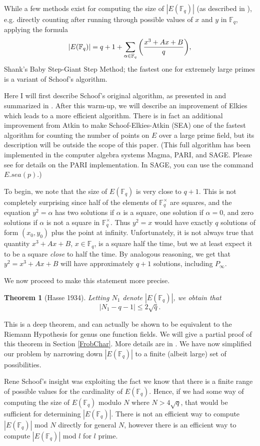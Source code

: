 \documentclass{article}
\newtheorem{Thm}{Theorem}
\newcommand{\f}{\mathbb{F}}
\begin{document}
While a few methods exist for computing the size of $|E(\f_q)|$ (as
described in \cite{Harris}), e.g. directly counting after running
through possible values of $x$ and $y$ in $\f_q$, applying the
formula $$|E(\f_q)| = q + 1 + \sum_{\alpha \in \f_q} \bigg({x^3+Ax+B
\over q}\bigg), $$ Shank's Baby Step-Giant Step
Method; the fastest one for extremely large primes is
a variant of Schoof's algorithm.

Here I will first describe Schoof's original algorithm, as presented
in \cite{Schoof1} and summarized in \cite{Wash}.  After this
warm-up, we will describe an improvement of Elkies which leads to a
more efficient algorithm.  There is in fact an additional
improvement from Atkin to make Schoof-Elkies-Atkin (SEA) one of the
fastest algorithm for counting the number of points on $E$ over a
large prime field, but its description will be outside the scope of
this paper.  (This full algorithm has been implemented in the
computer algebra systems Magma, PARI, and SAGE.  Please see
\cite{PariImp} for details on the PARI implementation.  In SAGE, you
can use the command $E.sea(p)$.)

To begin, we note that the size of $E(\f_q)$ is very close to $q+1$.  This is not completely surprising
since half of the elements of $\f_q^\times$ are squares, and the equation $y^2 = \alpha$ has two solutions
if $\alpha$ is a square, one solution if $\alpha=0$, and zero solutions if $\alpha$ is not a square
in $\f_q^\times$.  Thus $y^2 = x$ would have exactly $q$ solutions of form $(x_0,y_0)$ plus the point at
infinity. Unfortunately, it is not always true that quantity $x^3+Ax+B$, $x \in \f_q$, is a square half
the time, but we at least expect it to be a square \emph{close} to half the time.  By analogous
reasoning, we get that $y^2 = x^3+Ax+B$ will have approximately $q+1$ solutions, including
$P_\infty$.  

We now proceed to make this statement more precise.
\begin{Thm} [Hasse 1934] \label{HasseWeil}
Letting $N_1$ denote $|E(\f_q)|$, we obtain that $$|N_1 - q -1| \leq 2\sqrt{q}.$$
\end{Thm}
\noindent This is a deep theorem, and can actually be shown to be equivalent to the Riemann Hypothesis for
genus one function fields.  We will give a partial proof of this theorem in Section \ref{FrobChar}.  More details are in \cite{Wash}.
 We have now simplified our problem by narrowing down $|E(\f_q)|$ to a finite (albeit large) set of
possibilities.

Rene Schoof's insight was exploiting the fact we know that there is a finite range of
possible values for the cardinality of $E(\f_q)$.  Hence, if we had some way of computing
the size of $E(\f_q)$ modulo $N$ where $N > 4\sqrt{q}$, that would be sufficient for determining $|E(\f_q)|$.  There is not an efficient way to compute
$|E(\f_q)|$ mod $N$ directly for general $N$, however there is an efficient way to compute $|E(\f_q)|$ mod $l$ for $l$ prime.
\end{document}
